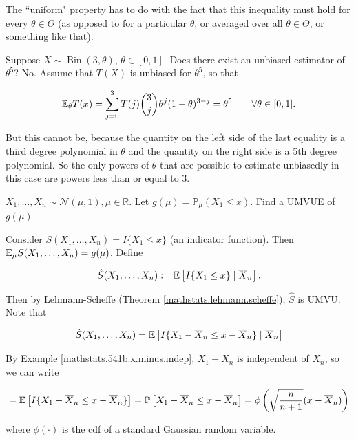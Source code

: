 \begin{remark}The ``uniform" property has to do with the fact that this inequality must hold for every \(\theta \in \Theta\) (as opposed to for a particular \(\theta\), or averaged over all \(\theta \in \Theta\), or something like that).

\end{remark}

\begin{example}

Suppose \(X \sim \operatorname{Bin}(3, \theta)\), \(\theta \in [0,1]\). Does there exist an unbiased estimator of \(\theta^5\)? No. Assume that \(T(X)\) is unbiased for \(\theta^5\), so that 

\[
\E_\theta T(x) = \sum_{j=0}^3 T(j) \binom{3}{j} \theta^j (1 - \theta)^{3-j} = \theta^5 \qquad \forall \theta \in [0,1].
\]

But this cannot be, because the quantity on the left side of the last equality is a third degree polynomial in \(\theta\) and the quantity on the right side is a 5th degree polynomial. So the only powers of \(\theta\) that are possible to estimate unbiasedly in this case are powers less than or equal to 3.

\end{example}

\begin{example}

\(X_1, \ldots, X_n \sim \mathcal{N}(\mu, 1), \mu \in \mathbb{R}\). Let \(g(\mu) = \mathbb{P}_\mu (X_1 \leq x)\). Find a UMVUE of \(g(\mu)\).

\end{example}

\begin{solution}

Consider \(S(X_1, \ldots, X_n) = I \{X_1 \leq x\}\) (an indicator function). Then  \(\E_\mu S(X_1, \ldots, X_n) = g(\mu)\). Define 

\[
\hat{S}(X_1, \ldots, X_n) := \E \left[I \{X_1 \leq x\} \mid \overline{X}_n \right].
\]

Then by Lehmann-Scheffe (Theorem \ref{mathstats.lehmann.scheffe}), \(\hat{S}\) is UMVU. Note that 

\[
\hat{S}(X_1, \ldots, X_n) = \E \left[I \{X_1 - \overline{X}_n \leq x - \overline{X}_n\} \mid \overline{X}_n \right]
\]

By Example \ref{mathstats.541b.x.minus.indep}, \(X_1 - \overline{X}_n\) is independent of \(\overline{X}_n\), so we can write

\[
= \E \left[I \{X_1 - \overline{X}_n \leq x - \overline{X}_n\} \right] = \mathbb{P} \left[X_1 - \overline{X}_n \leq x - \overline{X}_n \right] = \phi \left(  \sqrt{ \frac{n}{n+1}} (x - \overline{X}_n) \right)
\]

where \(\phi(\cdot)\) is the cdf of a standard Gaussian random variable.

\end{solution}

